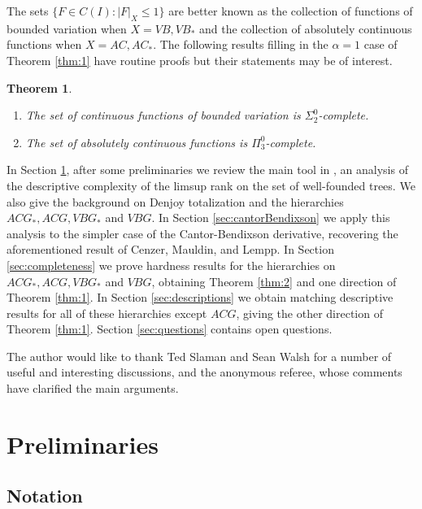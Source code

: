 \documentclass[12pt]{amsart}
\newtheorem{theorem}{Theorem}
\newcommand{\august}[1]{#1}%
\begin{document}
The sets $\{F\in C(I) : |F|_{X} \leq 1\}$ are better known 
as the collection of functions of bounded variation when $X = VB, VB_\ast$ 
and the collection of absolutely continuous functions when $X = AC, AC_\ast$. 
The following results 
filling in the $\alpha=1$ case of Theorem \ref{thm:1}
have routine proofs but their statements may be of interest.
\begin{theorem}
\begin{enumerate}
\item The set of continuous functions of bounded variation is $\Sigma^0_2$-complete.
\item The set of absolutely continuous functions is $\Pi^0_3$-complete.
\end{enumerate}
\end{theorem}


In Section \ref{sec:prelim}, after some preliminaries we 
review the main tool in \cite{Westrick2014}, an analysis of the 
descriptive complexity of the limsup rank on the set of well-founded 
trees.  We also give the 
background on Denjoy totalization and the hierarchies $ACG_\ast, 
ACG, VBG_\ast$ and $VBG$.  
In Section \ref{sec:cantorBendixson} we apply this analysis 
to the simpler case of the Cantor-Bendixson derivative, recovering the 
aforementioned result of {Cenzer, Mauldin, and } Lempp.
In Section \ref{sec:completeness} we prove hardness results for 
the hierarchies on $ACG_\ast, ACG, VBG_\ast$ and $VBG$, obtaining 
Theorem \ref{thm:2} and one direction of Theorem \ref{thm:1}.
In Section \ref{sec:descriptions} we obtain
matching descriptive results for all of these hierarchies except $ACG$, 
giving the other direction of Theorem \ref{thm:1}. 
Section \ref{sec:questions} contains open questions.


The author would like to thank Ted Slaman and Sean Walsh for a number of 
useful and interesting discussions, \august{and the anonymous referee, 
whose comments have clarified the main arguments.}


\section{Preliminaries}\label{sec:prelim}

\subsection{Notation}
\end{document}
